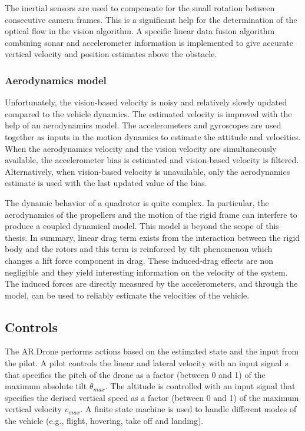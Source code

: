 The inertial sensors are used to compensate for the small rotation between consecutive camera frames.
This is a significant help for the determination of the optical flow in the vision algorithm.
A specific linear data fusion algorithm combining sonar and accelerometer information is implemented to give accurate vertical velocity and position estimates above the obstacle.

\subsubsection{Aerodynamics model}
Unfortunately, the vision-based velocity is noisy and relatively slowly updated compared to the vehicle dynamics.
The estimated velocity is improved with the help of an aerodynamics model.
The accelerometers and gyroscopes are used together as inputs in the motion dynamics to estimate the attitude and velocities.
When the aerodynamics velocity and the vision velocity are simultaneously available, the accelerometer bias is estimated and vision-based velocity is filtered.
Alternatively, when vision-based velocity is unavailable, only the aerodynamics estimate is used with the last updated value of the bias.

The dynamic behavior of a quadrotor is quite complex.
In particular, the aerodynamics of the propellers and the motion of the rigid frame can interfere to produce a coupled dynamical model.
This model is beyond the scope of this thesis.
In summary, linear drag term exists from the interaction between the rigid body and the rotors and this term is reinforced by tilt phenomenon which changes a lift force component in drag.
These induced-drag effects are non negligible and they yield interesting information on the velocity of the system.
The induced forces are directly measured by the accelerometers, and through the model, can be used to reliably estimate the velocities of the vehicle.



\subsection{Controls}
\label{sec:platform-controls}
The AR.Drone performs actions based on the estimated state and the input from the pilot.
A pilot controls the linear and lateral velocity with an input signal $s$ that specifies the pitch of the drone as a factor (between 0 and 1) of the maximum absolute tilt $\theta_{max}$.
The altitude is controlled with an input signal that specifies the derised vertical speed as a factor (between 0 and 1) of the maximum vertical velocity $v_{max}$.
A finite state machine is used to handle different modes of the vehicle (e.g., flight, hovering, take off and landing).

